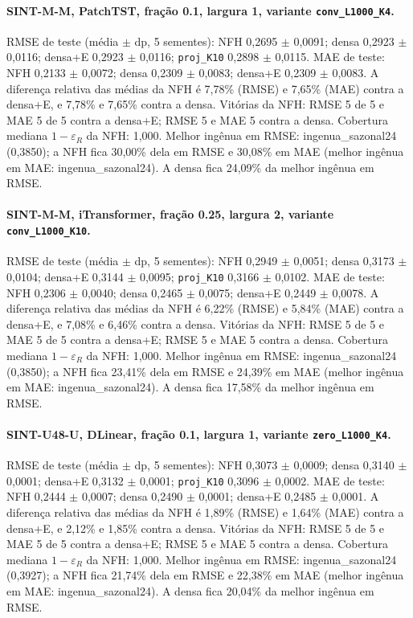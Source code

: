 \documentclass[11pt,a4paper]{article}
\begin{document}
\paragraph{SINT-M-M, PatchTST, fração 0.1, largura 1, variante \texttt{conv\_\allowbreak{}L1000\_\allowbreak{}K4}.} RMSE de teste (média $\pm$ dp, 5 sementes): NFH 0,2695 $\pm$ 0,0091; densa 0,2923 $\pm$ 0,0116; densa+E 0,2923 $\pm$ 0,0116; \texttt{proj\_K10} 0,2898 $\pm$ 0,0115. MAE de teste: NFH 0,2133 $\pm$ 0,0072; densa 0,2309 $\pm$ 0,0083; densa+E 0,2309 $\pm$ 0,0083. A diferença relativa das médias da NFH é \textminus{}7,78\% (RMSE) e \textminus{}7,65\% (MAE) contra a densa+E, e \textminus{}7,78\% e \textminus{}7,65\% contra a densa. Vitórias da NFH: RMSE 5 de 5 e MAE 5 de 5 contra a densa+E; RMSE 5 e MAE 5 contra a densa. Cobertura mediana $1-\varepsilon_R$ da NFH: 1,000. 
Melhor ingênua em RMSE: ingenua\_sazonal24 (0,3850); a NFH fica \textminus{}30,00\% dela em RMSE e \textminus{}30,08\% em MAE (melhor ingênua em MAE: ingenua\_sazonal24). A densa fica \textminus{}24,09\% da melhor ingênua em RMSE.


\paragraph{SINT-M-M, iTransformer, fração 0.25, largura 2, variante \texttt{conv\_\allowbreak{}L1000\_\allowbreak{}K10}.} RMSE de teste (média $\pm$ dp, 5 sementes): NFH 0,2949 $\pm$ 0,0051; densa 0,3173 $\pm$ 0,0104; densa+E 0,3144 $\pm$ 0,0095; \texttt{proj\_K10} 0,3166 $\pm$ 0,0102. MAE de teste: NFH 0,2306 $\pm$ 0,0040; densa 0,2465 $\pm$ 0,0075; densa+E 0,2449 $\pm$ 0,0078. A diferença relativa das médias da NFH é \textminus{}6,22\% (RMSE) e \textminus{}5,84\% (MAE) contra a densa+E, e \textminus{}7,08\% e \textminus{}6,46\% contra a densa. Vitórias da NFH: RMSE 5 de 5 e MAE 5 de 5 contra a densa+E; RMSE 5 e MAE 5 contra a densa. Cobertura mediana $1-\varepsilon_R$ da NFH: 1,000. 
Melhor ingênua em RMSE: ingenua\_sazonal24 (0,3850); a NFH fica \textminus{}23,41\% dela em RMSE e \textminus{}24,39\% em MAE (melhor ingênua em MAE: ingenua\_sazonal24). A densa fica \textminus{}17,58\% da melhor ingênua em RMSE.


\paragraph{SINT-U48-U, DLinear, fração 0.1, largura 1, variante \texttt{zero\_\allowbreak{}L1000\_\allowbreak{}K4}.} RMSE de teste (média $\pm$ dp, 5 sementes): NFH 0,3073 $\pm$ 0,0009; densa 0,3140 $\pm$ 0,0001; densa+E 0,3132 $\pm$ 0,0001; \texttt{proj\_K10} 0,3096 $\pm$ 0,0002. MAE de teste: NFH 0,2444 $\pm$ 0,0007; densa 0,2490 $\pm$ 0,0001; densa+E 0,2485 $\pm$ 0,0001. A diferença relativa das médias da NFH é \textminus{}1,89\% (RMSE) e \textminus{}1,64\% (MAE) contra a densa+E, e \textminus{}2,12\% e \textminus{}1,85\% contra a densa. Vitórias da NFH: RMSE 5 de 5 e MAE 5 de 5 contra a densa+E; RMSE 5 e MAE 5 contra a densa. Cobertura mediana $1-\varepsilon_R$ da NFH: 1,000. 
Melhor ingênua em RMSE: ingenua\_sazonal24 (0,3927); a NFH fica \textminus{}21,74\% dela em RMSE e \textminus{}22,38\% em MAE (melhor ingênua em MAE: ingenua\_sazonal24). A densa fica \textminus{}20,04\% da melhor ingênua em RMSE.
\end{document}
